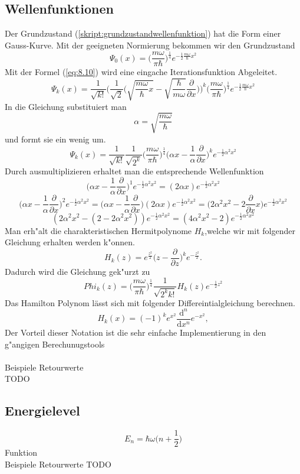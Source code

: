 \begin{refsection}
\subsection{Wellenfunktionen}
Der Grundzustand (\ref{skript:grundzustandwellenfunktion}) hat die Form einer Gauss-Kurve. Mit der geeigneten Normierung bekommen wir den Grundzustand
\[
\Psi_0(x)
=
\biggl(\frac{m\omega}{\pi\hbar}\biggr)^\frac14
e^{-\frac12\frac{m\omega}{\hbar}x^2}
\]
Mit der Formel (\ref{eq:8.10}) wird eine eingache Iterationsfunktion Abgeleitet.
\[
\Psi_k(x)
=
\frac1{\sqrt{k!}}\biggl(\frac1{\sqrt{2}}
\biggl(\sqrt{\frac{m\omega}{\hbar}x}-
\sqrt{\frac{\hbar}{m\omega}}\frac{\partial}{\partial x}\biggr)\biggr)^k
\biggl(\frac{m\omega}{\pi\hbar}\biggr)^\frac14
e^{-\frac12\frac{m\omega}{\hbar}x^2}
\]
In die Gleichung substituiert man
\[
\alpha=\sqrt{\frac{m\omega}\hbar}
\]
und formt sie ein wenig um.
\[
\Psi_k(x)
=
\frac1{\sqrt{k!}}\frac1{\sqrt{2^k}}
\biggl(\frac{m\omega}{\pi\hbar}\biggr)^\frac14
\biggl(\alpha x-\frac1{\alpha}\frac{\partial}{\partial x}\biggr)^k
e^{-\frac12\alpha^2x^2}
\]
Durch ausmultiplizieren erhaltet man die entsprechende Wellenfunktion
\[
\biggl(\alpha x-\frac1{\alpha}\frac{\partial}{\partial x}\biggr)^1
e^{-\frac12\alpha^2x^2}
=
(2\alpha x)e^{-\frac12\alpha^2x^2}
\]
\[
\biggl(\alpha x-\frac1{\alpha}\frac{\partial}{\partial x}\biggr)^2
e^{-\frac12\alpha^2x^2}
=
\biggl(\alpha x-\frac1{\alpha}\frac{\partial}{\partial x}\biggr)
(2\alpha x)e^{-\frac12\alpha^2x^2}
=
\biggl(2\alpha^2 x^2-2\frac{\partial}{\partial x}x\biggr)
e^{-\frac12\alpha^2x^2}
\]
\[
(2\alpha^2x^2-(2-2\alpha^2x^2))e^{-\frac12\alpha^2x^2}
=
(4\alpha^2x^2-2)e^{-\frac12\alpha^2x^2}
\]
Man erh"alt die charakteristischen Hermitpolynome $H_k$,welche wir mit folgender Gleichung erhalten werden k"onnen.
\[
H_k(z)
=
e^{\frac{z^2}2}\biggl(z-\frac{\partial}{\partial z}\biggr)^k
e^{-\frac{z^2}2}.
\]
Dadurch wird die Gleichung gek"urzt zu
\[
Phi_k(z)
=
\biggl(\frac{m\omega}{\pi\hbar}\biggr)^\frac14
\frac1{\sqrt{2^k k!}}H_k(z)
e^{-\frac12 z^2}
\]
Das Hamilton Polynom lässt sich mit folgender Differeintialgleichung berechnen.
\[
H_k(x)
=
(-1)^k e^{x^2}\frac{\mathrm d^n}{\mathrm d x^n}
e^{-x^2},
\]
Der Vorteil dieser Notation ist die sehr einfache Implementierung in den g"angigen Berechunugstools\\
\\
Beispiele Retourwerte\\
TODO

\subsection{Energielevel}
\[
E_n
=
\hbar\omega\biggl(n+\frac12\biggr)
\]
Funktion\\
Beispiele Retourwerte TODO


\end{refsection}
